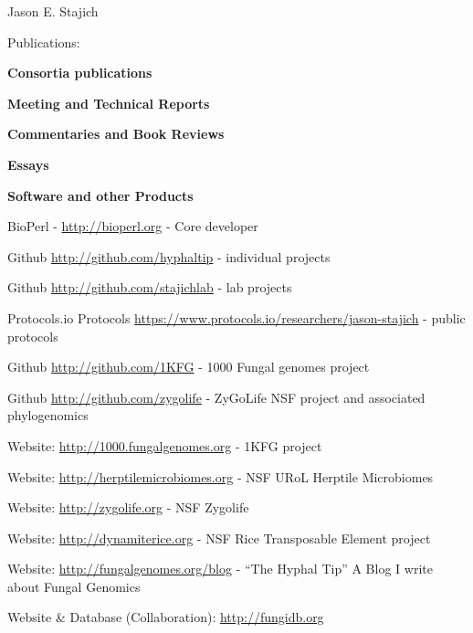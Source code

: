 \documentclass[10pt]{article}
\begin{document}
\begin{cv}{\centerline{Jason E. Stajich}}
\begin{cvlist}{Publications:}

\item \textbf{Consortia publications}


\item \textbf{Meeting and Technical Reports}


\item \textbf{Commentaries and Book Reviews}


\item \textbf{Essays}

\begin{cvlistcompact}{\bf Software and other Products}
  \item BioPerl - \url{http://bioperl.org} - Core developer
\item Github \url{http://github.com/hyphaltip} - individual
  projects
\item Github \url{http://github.com/stajichlab} - lab
  projects
 \item Protocols.io Protocols \url{https://www.protocols.io/researchers/jason-stajich} - public protocols
 \item Github \url{http://github.com/1KFG} - 1000 Fungal
   genomes project
\item Github \url{http://github.com/zygolife} - ZyGoLife NSF project
  and associated phylogenomics
\item Website: \url{http://1000.fungalgenomes.org} - 1KFG project
\item Website: \url{http://herptilemicrobiomes.org} - NSF URoL Herptile Microbiomes
\item Website: \url{http://zygolife.org} - NSF Zygolife
\item Website: \url{http://dynamiterice.org} - NSF Rice Transposable
    Element project
\item Website: \url{http://fungalgenomes.org/blog} - ``The Hyphal
  Tip'' A Blog I write about Fungal Genomics
\item Website \& Database (Collaboration): \url{http://fungidb.org}
\end{cvlistcompact}



\end{cvlist}
\end{cv}
\end{document}

